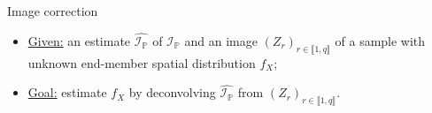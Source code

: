 \begin{frame}{Image correction}
\begin{itemize}
\item \underline{Given:} an estimate $\widehat{\mathcal{I}_{\mathds{P}}}$ of $\mathcal{I}_{\mathds{P}}$ and an image $(Z_{r})_{r \in \llbracket 1, q \rrbracket}$ of a sample with unknown end-member spatial distribution $f_{X}$;
\item \underline{Goal:} estimate $f_{X}$ by deconvolving $\widehat{\mathcal{I}_{\mathds{P}}}$ from $(Z_{r})_{r \in \llbracket 1, q \rrbracket}$.
\end{itemize}
\end{frame}